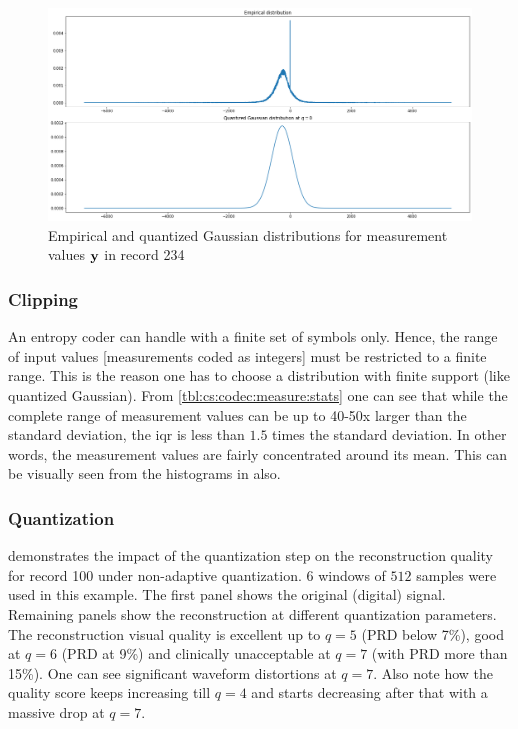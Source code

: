 \begin{figure}[htb]
    \centering %
  \centering 
  \includegraphics[width=0.95\linewidth]
  {images/rec_234_empirical_vs_quantized_gaussian.png}
\caption{Empirical and quantized Gaussian distributions for measurement values
$\mathbf{y}$ in record 234}
\label{fig:cs:codec:y:234:empirical:quantized}
\end{figure}

\subsubsection{Clipping}

An entropy coder can handle with a finite set of symbols
only. Hence, the range of input values [measurements
coded as integers] must be restricted to a finite range.
This is the reason one has to choose a distribution
with finite support (like quantized Gaussian).
From \cref{tbl:cs:codec:measure:stats} one can see that
while the complete range of measurement values can be
up to 40-50x larger than the standard deviation, the iqr
is less than $1.5$ times the standard deviation. In other
words, the measurement values are fairly concentrated
around its mean. This can be visually seen from the
histograms in  also.

\subsubsection{Quantization}

 demonstrates the impact of the
quantization step on the reconstruction quality
for record 100 under non-adaptive quantization.
$6$ windows of $512$ samples
were used in this example. The first panel
shows the original (digital) signal. Remaining
panels show the reconstruction at different
quantization parameters.
The reconstruction visual quality is excellent
up to $q=5$ (PRD below 7\%), good at $q=6$ (PRD at 9\%)
and clinically unacceptable at $q=7$
(with PRD more than 15\%).
One can see significant waveform distortions at $q=7$.
Also note how the quality score keeps increasing till
$q=4$ and starts decreasing after that with a massive
drop at $q=7$.



